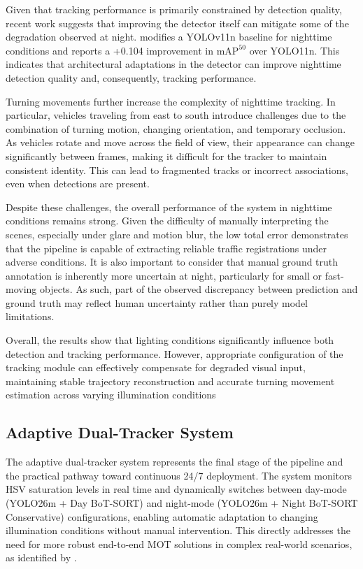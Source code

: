 Given that tracking performance is primarily constrained by detection quality, recent work suggests that improving the detector itself can mitigate some of the degradation observed at night. \cite{YOLO-night} modifies a YOLOv11n baseline for nighttime conditions and reports a +0.104 improvement in $\mathrm{mAP}^{50}$ over YOLO11n. This indicates that architectural adaptations in the detector can improve nighttime detection quality and, consequently, tracking performance.

Turning movements further increase the complexity of nighttime tracking. In particular, vehicles traveling from east to south introduce challenges due to the combination of turning motion, changing orientation, and temporary occlusion. As vehicles rotate and move across the field of view, their appearance can change significantly between frames, making it difficult for the tracker to maintain consistent identity. This can lead to fragmented tracks or incorrect associations, even when detections are present.

Despite these challenges, the overall performance of the system in nighttime conditions remains strong. Given the difficulty of manually interpreting the scenes, especially under glare and motion blur, the low total error demonstrates that the pipeline is capable of extracting reliable traffic registrations under adverse conditions. It is also important to consider that manual ground truth annotation is inherently more uncertain at night, particularly for small or fast-moving objects. As such, part of the observed discrepancy between prediction and ground truth may reflect human uncertainty rather than purely model limitations.

Overall, the results show that lighting conditions significantly influence both detection and tracking performance. However, appropriate configuration of the tracking module can effectively compensate for degraded visual input, maintaining stable trajectory reconstruction and accurate turning movement estimation across varying illumination conditions

\subsection{Adaptive Dual-Tracker System}
The adaptive dual-tracker system represents the final stage of the pipeline and the practical pathway toward continuous 24/7 deployment. The system monitors HSV saturation levels in real time and dynamically switches between day-mode (YOLO26m + Day BoT-SORT) and night-mode (YOLO26m + Night BoT-SORT Conservative) configurations, enabling automatic adaptation to changing illumination conditions without manual intervention. This directly addresses the need for more robust end-to-end MOT solutions in complex real-world scenarios, as identified by \citet{Hassan2024}.

